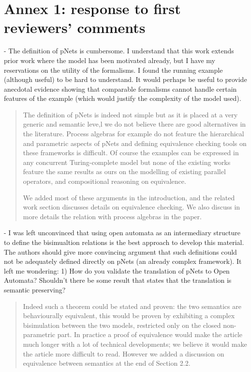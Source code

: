 \documentclass{article}
\begin{document}
\section*{Annex 1: response to first reviewers' comments}

- The definition of pNets is cumbersome. I understand that this work extends prior work where the model has been motivated already, but I have my reservations on the utility of the formalisms.    I found the running example (although useful) to be hard to understand.  It would perhaps be useful to provide anecdotal evidence showing that comparable formalisms cannot handle certain features of the example (which would justify the complexity of the model used).
\begin{quote}
The definition of pNets is indeed not simple but as it is placed at a very generic and semantic leve,l we do not believe there are good alternatives in the literature. Process algebras for example do not feature the hierarchical and parametric aspects of pNets and defining equivalence checking tools on these frameworks is difficult. Of course the examples can be expressed in any concurrent Turing-complete model but none of the existing works feature the same results as ours on the modelling of existing parallel operators, and compositional reasoning on equivalence.

We added most of these arguments in the introduction, and the related work section discusses details on equivalence checking. We also discuss in more details the relation with process algebras in the paper.
\end{quote}

- I was left unconvinced that using open automata as an intermediary structure to define the bisimualtion relations is the best approach to develop this material.  The authors should give more convincing argument that such definitions could not be adequately defined directly on pNets (an already complex framework).  It left me wondering:
1) How do you validate the translation of pNets to Open Automata?  Shouldn't there be some result that states that the translation is semantic preserving?   
\begin{quote}
Indeed such a theorem could be stated and proven: the two semantics are behaviourally equivalent, this would be proven by exhibiting a complex bisimulation between the two models, restricted only on the closed non-parametric part. In practice a proof of equivalence would make the article much longer with a lot of technical developments; we believe it would make the article more difficult to read. However we added a discussion on equivalence between semantics at the end of Section 2.2.
\end{quote}
 
\end{document}
